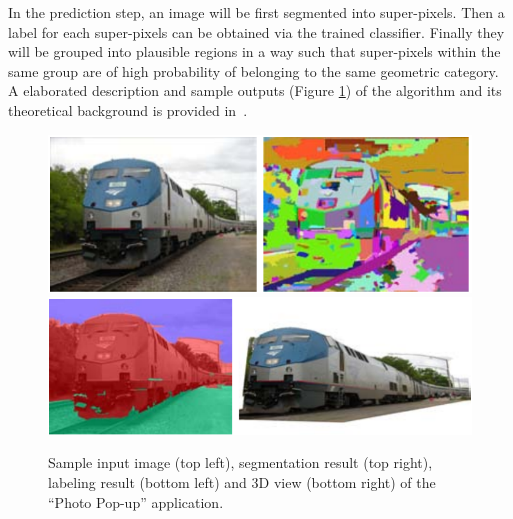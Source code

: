In the prediction step, an image will be first segmented into super-pixels. Then a label for each super-pixels can be obtained via the trained classifier. Finally they will be grouped into plausible regions in a way such that super-pixels within the same group are of high probability of belonging to the same geometric category. A elaborated description and sample outputs (Figure \ref{3Dfig}) of the algorithm and its theoretical background is provided in~\cite{hoiem2005automatic}.

\begin{figure}[h!]
\centering
\includegraphics[width=0.8\linewidth]{pics/3d1.png}
\includegraphics[width=0.8\linewidth]{pics/3d2.png}
\caption{Sample input image (top left), segmentation result (top right), labeling result (bottom left) and 3D view (bottom right) of the ``Photo Pop-up'' application.}
\label{3Dfig}
\end{figure}
